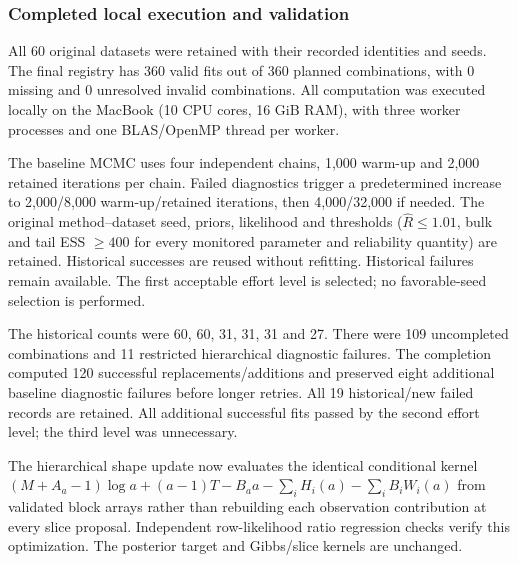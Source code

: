 \subsubsection*{Completed local execution and validation}

All 60 original datasets were retained with their recorded identities and seeds. The final registry has 360 valid fits out of 360 planned combinations, with 0 missing and 0 unresolved invalid combinations. All computation was executed locally on the MacBook (10 CPU cores, 16 GiB RAM), with three worker processes and one BLAS/OpenMP thread per worker.

The baseline MCMC uses four independent chains, 1,000 warm-up and 2,000 retained iterations per chain. Failed diagnostics trigger a predetermined increase to 2,000/8,000 warm-up/retained iterations, then 4,000/32,000 if needed. The original method--dataset seed, priors, likelihood and thresholds ($\widehat R\le1.01$, bulk and tail ESS $\ge400$ for every monitored parameter and reliability quantity) are retained. Historical successes are reused without refitting. Historical failures remain available. The first acceptable effort level is selected; no favorable-seed selection is performed.

The historical counts were 60, 60, 31, 31, 31 and 27. There were 109 uncompleted combinations and 11 restricted hierarchical diagnostic failures. The completion computed 120 successful replacements/additions and preserved eight additional baseline diagnostic failures before longer retries. All 19 historical/new failed records are retained. All additional successful fits passed by the second effort level; the third level was unnecessary.

The hierarchical shape update now evaluates the identical conditional kernel $(M+A_a-1)\log a+(a-1)T-B_a a-\sum_iH_i(a)-\sum_iB_iW_i(a)$ from validated block arrays rather than rebuilding each observation contribution at every slice proposal. Independent row-likelihood ratio regression checks verify this optimization. The posterior target and Gibbs/slice kernels are unchanged.

